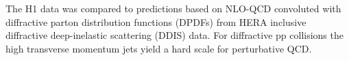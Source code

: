 The H1 data was compared to predictions based on NLO-QCD convoluted with diffractive parton distribution functions (DPDFs) from HERA inclusive diffractive deep-inelastic scattering (DDIS) data. For diffractive pp collisions the high transverse momentum jets yield a hard scale for perturbative QCD. 

